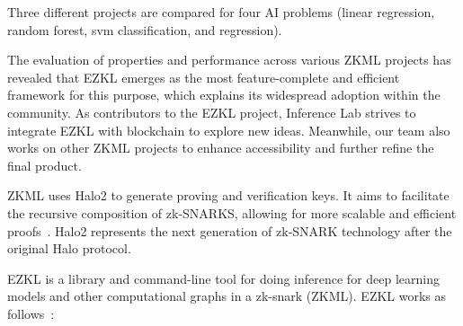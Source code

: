 \documentclass[conference]{IEEEtran}
\begin{document}
Three different projects are compared for four AI problems (linear regression, random forest, svm classification, and regression).

The evaluation of properties and performance across various ZKML projects has revealed that EZKL emerges as the most feature-complete and efficient framework for this purpose, which explains its widespread adoption within the community. As contributors to the EZKL project, Inference Lab strives to integrate EZKL with blockchain to explore new ideas. Meanwhile, our team also works on other ZKML projects to enhance accessibility and further refine the final product.

ZKML uses Halo2 to generate proving and verification keys.  It aims to facilitate the recursive composition of zk-SNARKS, allowing for more scalable and efficient proofs~\cite{ZcashHalo2GH}. Halo2 represents the next generation of zk-SNARK technology after the original Halo protocol.

EZKL is a library and command-line tool for doing inference for deep learning models and other computational graphs in a zk-snark (ZKML). EZKL works as follows~\cite{ZconduitEZKLGH}:
\end{document}
